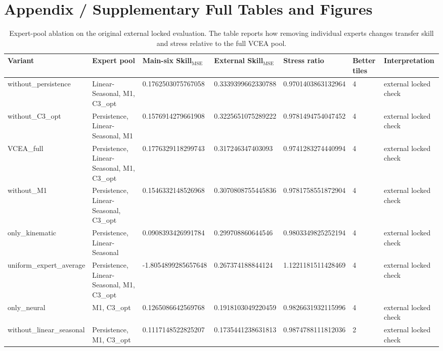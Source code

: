 


\section*{Appendix / Supplementary Full Tables and Figures}



\begin{table}[t]
\centering
\footnotesize
\begin{tabular}{lllllll}
\toprule
Variant & Expert pool & Main-six Skill$_{\mathrm{MSE}}$ & External Skill$_{\mathrm{MSE}}$ & Stress ratio & Better tiles & Interpretation \\
\midrule
without\_persistence & Linear-Seasonal, M1, C3\_opt & 0.1762503075767058 & 0.3339399662330788 & 0.9701403863132964 & 4 & external locked check \\
without\_C3\_opt & Persistence, Linear-Seasonal, M1 & 0.1576914279661908 & 0.3225651075289222 & 0.9781494754047452 & 4 & external locked check \\
VCEA\_full & Persistence, Linear-Seasonal, M1, C3\_opt & 0.1776329118299743 & 0.317246347403093 & 0.9741283274440994 & 4 & external locked check \\
without\_M1 & Persistence, Linear-Seasonal, C3\_opt & 0.1546332148526968 & 0.3070808755445836 & 0.9781758551872904 & 4 & external locked check \\
only\_kinematic & Persistence, Linear-Seasonal & 0.0908393426991784 & 0.299708860644546 & 0.9803349825252194 & 4 & external locked check \\
uniform\_expert\_average & Persistence, Linear-Seasonal, M1, C3\_opt & -1.8054899285657648 & 0.267374188844124 & 1.1221181511428469 & 4 & external locked check \\
only\_neural & M1, C3\_opt & 0.1265086642569768 & 0.1918103049220459 & 0.9826631932115996 & 4 & external locked check \\
without\_linear\_seasonal & Persistence, M1, C3\_opt & 0.1117148522825207 & 0.1735441238631813 & 0.9874788111812036 & 2 & external locked check \\
\bottomrule
\end{tabular}
\caption{Expert-pool ablation on the original external locked evaluation. The table reports how removing individual experts changes transfer skill and stress relative to the full VCEA pool.}
\label{tab:e2_expert_ablation_external}
\end{table}

